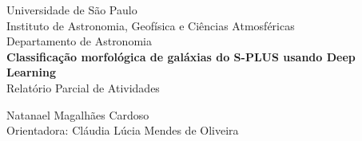 \begin{titlepage}
  \begin{center}
    Universidade de São Paulo\\
    Instituto de Astronomia, Geofísica e Ciências Atmosféricas\\
    Departamento de Astronomia\\
    
    \vfill
    \large
    \textbf{Classificação morfológica de galáxias do S-PLUS usando Deep Learning}\\
    \vspace{.6cm}
    Relatório Parcial de Atividades
    
    \vfill
    Natanael Magalhães Cardoso\\
    {\normalsize Orientadora:} Cláudia Lúcia Mendes de Oliveira
    \vspace{2cm}
  \end{center}
\end{titlepage}